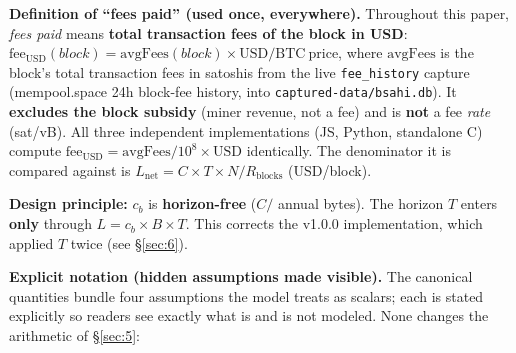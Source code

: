 \documentclass[11pt]{article}
\begin{document}
\textbf{Definition of ``fees paid'' (used once, everywhere).} Throughout this paper, \emph{fees paid} means \textbf{total transaction fees of the block in USD}: $\mathrm{fee_{USD}}(block) = \mathrm{avgFees}(block) \times \mathrm{USD/BTC\ price}$, where $\mathrm{avgFees}$ is the block's total transaction fees in satoshis from the live \texttt{fee\_history} capture (mempool.space 24h block-fee history, into \texttt{captured-data/bsahi.db}). It \textbf{excludes the block subsidy} (miner revenue, not a fee) and is \textbf{not} a fee \emph{rate} (sat/vB). All three independent implementations (JS, Python, standalone C) compute $\mathrm{fee_{USD}} = \mathrm{avgFees}/10^8 \times \mathrm{USD}$ identically. The denominator it is compared against is $L_{\mathrm{net}} = C \times T \times N / R_{\mathrm{blocks}}$ (USD/block).

\textbf{Design principle:} $c_b$ is \textbf{horizon-free} ($C /$ annual bytes). The horizon $T$ enters \textbf{only} through $L = c_b \times B \times T$. This corrects the v1.0.0 implementation, which applied $T$ twice (see \S\ref{sec:6}).

\textbf{Explicit notation (hidden assumptions made visible).} The canonical quantities bundle four assumptions the model treats as scalars; each is stated explicitly so readers see exactly what is and is not modeled. None changes the arithmetic of \S\ref{sec:5}:
\end{document}
